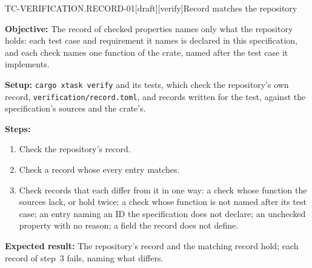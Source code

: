 \begin{requirement}{TC-VERIFICATION.RECORD-01}[draft][verify]{Record matches the repository}


  \textbf{Objective:} The record of checked properties names only what the
  repository holds: each test case and requirement it names is declared in
  this specification, and each check names one function of the crate, named
  after the test case it implements.

  \textbf{Setup:} \texttt{cargo xtask verify} and its tests, which check the
  repository's own record, \texttt{verification/record.toml}, and records
  written for the test, against the specification's sources and the
  crate's.

  \textbf{Steps:}
  \begin{enumerate}
    \item Check the repository's record.
    \item Check a record whose every entry matches.
    \item Check records that each differ from it in one way: a check whose
      function the sources lack, or hold twice; a check whose function is not
      named after its test case; an entry naming an ID the specification
      does not declare; an unchecked property with no reason; a field the
      record does not define.
  \end{enumerate}

  \textbf{Expected result:} The repository's record and the matching record
  hold; each record of step~3 fails, naming what differs.



\end{requirement}

